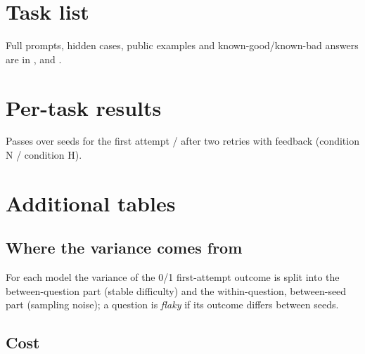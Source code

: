 \section{Task list}
\label{app:tasks}

Full prompts, hidden cases, public examples and known-good/known-bad answers are in ,  and .

\section{Per-task results}
\label{app:perq}
Passes over \nseeds{} seeds for the first attempt / after two retries with feedback (condition N / condition H).
{\small}

\section{Additional tables}
\subsection{Where the variance comes from}
For each model the variance of the 0/1 first-attempt outcome is split into the between-question part (stable difficulty) and the within-question, between-seed part (sampling noise); a question is \emph{flaky} if its outcome differs between seeds.
\begin{table}[h]\centering\small\caption{Variance decomposition of first-attempt outcomes.}\end{table}
\subsection{Cost}
\begin{table}[h]\centering\small\caption{Tokens, speed and retry cost. Speeds here are wall-clock rates including prompt processing and were measured while other (light) work ran on the machine; Section~\ref{sec:speed} gives controlled throughput.}\end{table}

